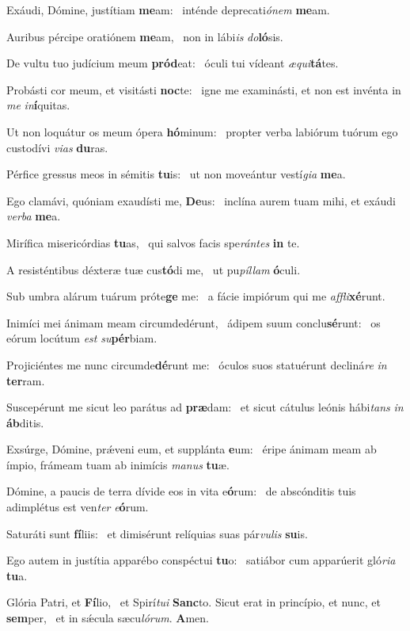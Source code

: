 \item Exáudi, Dómine, justítiam \textbf{me}am:~\psstar{} inténde deprecati\textit{ónem} \textbf{me}am.
\item Auribus pércipe oratiónem \textbf{me}am,~\psstar{} non in lábi\textit{is} \textit{do}\textbf{ló}sis.
\item De vultu tuo judícium meum \textbf{pród}eat:~\psstar{} óculi tui vídeant \textit{æqui}\textbf{tá}tes.
\item Probásti cor meum, et visitásti \textbf{noc}te:~\psstar{} igne me examinásti, et non est invénta in \textit{me} \textit{in}\textbf{í}quitas.
\item Ut non loquátur os meum ópera \textbf{hó}minum:~\psstar{} propter verba labiórum tuórum ego custodívi \textit{vias} \textbf{du}ras.
\item Pérfice gressus meos in sémitis \textbf{tu}is:~\psstar{} ut non moveántur vestí\textit{gia} \textbf{me}a.
\item Ego clamávi, quóniam exaudísti me, \textbf{De}us:~\psstar{} inclína aurem tuam mihi, et exáudi \textit{verba} \textbf{me}a.
\item Mirífica misericórdias \textbf{tu}as,~\psstar{} qui salvos facis spe\textit{rántes} \textbf{in} te.
\item A resisténtibus déxteræ tuæ cus\textbf{tó}di me,~\psstar{} ut pu\textit{píllam} \textbf{ó}culi.
\item Sub umbra alárum tuárum próte\textbf{ge} me:~\psstar{} a fácie impiórum qui me \textit{affli}\textbf{xé}runt.
\item Inimíci mei ánimam meam circumdedérunt,~\pscross{} ádipem suum conclu\textbf{sé}runt:~\psstar{} os eórum locútum \textit{est} \textit{su}\textbf{pér}biam.
\item Projiciéntes me nunc circumde\textbf{dé}runt me:~\psstar{} óculos suos statuérunt decliná\textit{re} \textit{in} \textbf{ter}ram.
\item Suscepérunt me sicut leo parátus ad \textbf{præ}dam:~\psstar{} et sicut cátulus leónis hábi\textit{tans} \textit{in} \textbf{áb}ditis.
\item Exsúrge, Dómine, prǽveni eum, et supplánta \textbf{e}um:~\psstar{} éripe ánimam meam ab ímpio, frámeam tuam ab inimícis \textit{manus} \textbf{tu}æ.
\item Dómine, a paucis de terra dívide eos in vita e\textbf{ó}rum:~\psstar{} de abscónditis tuis adimplétus est ven\textit{ter} \textit{e}\textbf{ó}rum.
\item Saturáti sunt \textbf{fí}liis:~\psstar{} et dimisérunt relíquias suas pár\textit{vulis} \textbf{su}is.
\item Ego autem in justítia apparébo conspéctui \textbf{tu}o:~\psstar{} satiábor cum apparúerit gló\textit{ria} \textbf{tu}a.
\item Glória Patri, et \textbf{Fí}lio,~\psstar{} et Spirí\textit{tui} \textbf{Sanc}to. Sicut erat in princípio, et nunc, et \textbf{sem}per,~\psstar{} et in sǽcula sæcu\textit{lórum}. \textbf{A}men.
